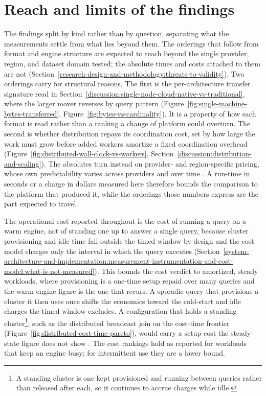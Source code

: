 \section{Reach and limits of the findings}
\label{discussion:reach-and-limits}

The findings split by kind rather than by question, separating what the measurements settle from what lies beyond them. The orderings that follow from format and engine structure are expected to reach beyond the single provider, region, and dataset domain tested; the absolute times and costs attached to them are not (Section~\ref{research-design-and-methodology:threats-to-validity}). Two orderings carry for structural reasons. The first is the per-architecture transfer signature read in Section~\ref{discussion:single-node-cloud-native-vs-traditional}, where the larger mover reverses by query pattern (Figure~\ref{fig:single-machine-bytes-transferred}, Figure~\ref{fig:bytes-vs-cardinality}). It is a property of how each format is read rather than a ranking a change of platform could overturn. The second is whether distribution repays its coordination cost, set by how large the work must grow before added workers amortize a fixed coordination overhead (Figure~\ref{fig:distributed-wall-clock-vs-workers}, Section~\ref{discussion:distribution-and-scaling}). The absolutes turn instead on provider- and region-specific pricing, whose own predictability varies across providers and over time \parencite{leitner2016_patterns_chaos_iaas,iosup2011_performance_variability_cloud_services,schad2010_runtime_measurements_cloud}. A run-time in seconds or a charge in dollars measured here therefore bounds the comparison to the platform that produced it, while the orderings those numbers express are the part expected to travel.

The operational cost reported throughout is the cost of running a query on a warm engine, not of standing one up to answer a single query, because cluster provisioning and idle time fall outside the timed window by design and the cost model charges only the interval in which the query executes (Section~\ref{system-architecture-and-implementation:measurement-instrumentation-and-cost-model:what-is-not-measured}). This bounds the cost verdict to amortized, steady workloads, where provisioning is a one-time setup repaid over many queries and the warm-engine figure is the one that recurs. A sporadic query that provisions a cluster it then uses once shifts the economics toward the cold-start and idle charges the timed window excludes. A configuration that holds a standing cluster\footnote{A standing cluster is one kept provisioned and running between queries rather than released after each, so it continues to accrue charges while idle.}, such as the distributed broadcast join on the cost-time frontier (Figure~\ref{fig:distributed-cost-time-pareto}), would carry a setup cost the steady-state figure does not show \parencite{databricks2024_cost_optimization_best_practices,jonas2019_berkeley_view_on_serverless_computing}. The cost rankings hold as reported for workloads that keep an engine busy; for intermittent use they are a lower bound.

